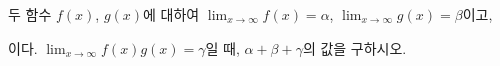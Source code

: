 두 함수 $f(x)$, $g(x)$에 대하여 $\displaystyle\lim_{x\to\infty} f(x)=\alpha$, $\displaystyle\lim_{x\to\infty} g(x)=\beta$이고,\par\smallskip{}\par\smallskip\noindent 이다. $\displaystyle\lim_{x\to\infty} f(x)g(x)=\gamma$일 때, $\alpha+\beta+\gamma$의 값을 구하시오. 

